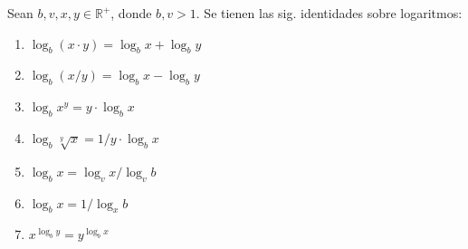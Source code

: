 \begin{thm}
Sean $b,v,x,y\in\mathbb{R^{+}}$, donde $b,v>1$. Se tienen las sig.
identidades sobre logaritmos:
\begin{enumerate}
\item $\log_{b}\left(x\cdot y\right)=\log_{b}x+\log_{b}y$
\item $\log_{b}\left(x/y\right)=\log_{b}x-\log_{b}y$
\item $\log_{b}x^{y}=y\cdot\log_{b}x$
\item $\log_{b}\sqrt[y]{x}=1/y\cdot\log_{b}x$
\item $\log_{b}x=\log_{v}x/\log_{v}b$
\item $\log_{b}x=1/\log_{x}b$
\item $x^{\log_{b}y}=y^{\log_{b}x}$
\end{enumerate}
\end{thm}
